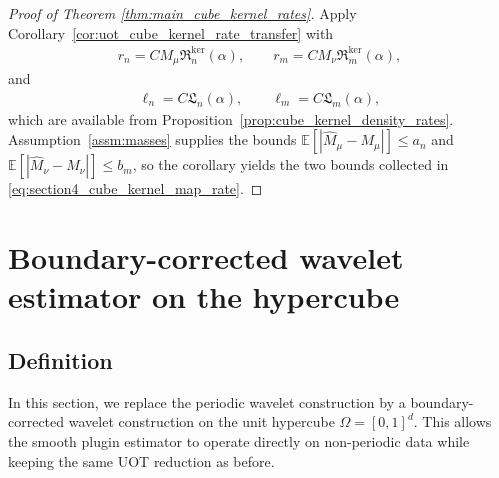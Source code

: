 \documentclass[11pt,reqno]{amsart}
\theoremstyle{definition}
\renewcommand{\hat}{\widehat}
\newcommand{\Ep}{\mathbb{E}}
\begin{document}
\begin{proof}[Proof of Theorem \ref{thm:main_cube_kernel_rates}]
Apply Corollary~\ref{cor:uot_cube_kernel_rate_transfer} with
\begin{align*}
    r_n = C M_\mu\mathfrak R_n^{\mathrm{ker}}(\alpha),
    \qquad
    r_m = C M_\nu\mathfrak R_m^{\mathrm{ker}}(\alpha),
\end{align*}
and
\begin{align*}
    \ell_n = C\mathfrak L_n(\alpha),
    \qquad
    \ell_m = C\mathfrak L_m(\alpha),
\end{align*}
which are available from Proposition~\ref{prop:cube_kernel_density_rates}. Assumption~\ref{assm:masses} supplies the bounds $\Ep[|\hat M_\mu-M_\mu|]\le a_n$ and $\Ep[|\hat M_\nu-M_\nu|]\le b_m$, so the corollary yields the two bounds collected in \eqref{eq:section4_cube_kernel_map_rate}. 
\end{proof}



\section{Boundary-corrected wavelet estimator on the hypercube}\label{sec:wavelet}

\subsection{Definition}

In this section, we replace the periodic wavelet construction by a boundary-corrected wavelet construction on the unit hypercube $\Omega=[0,1]^d$. This allows the smooth plugin estimator to operate directly on non-periodic data while keeping the same UOT reduction as before. 
\end{document}
